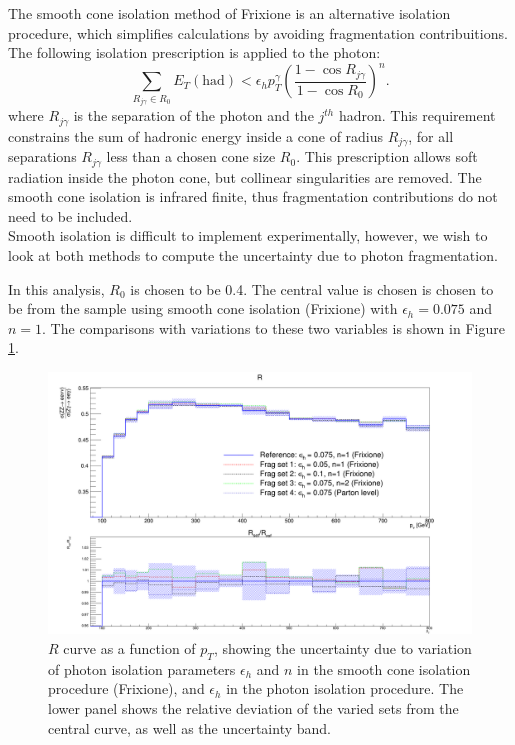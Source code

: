 \documentclass[11pt,a4paper,final]{report}
\begin{document}
The smooth cone isolation method of Frixione \cite{frixione} is an alternative isolation procedure, which simplifies calculations by avoiding fragmentation contribuitions. The following isolation prescription is applied to the photon:
\begin{equation}
	\sum_{R_{j\gamma} \in R_0} E_T(\text{had}) < \epsilon_h p_T^\gamma \left(\frac{1-\cos R_{j\gamma}}{1-\cos R_0}\right)^n.
\end{equation}
\label{eq:frix_isol}
where $R_{j\gamma}$ is the separation of the photon and the $j^{th}$ hadron. This requirement constrains the sum of hadronic energy inside a cone of radius $R_{j\gamma}$, for all separations $R_{j\gamma}$ less than a chosen cone size $R_0$. This prescription allows soft radiation inside the photon cone, but collinear singularities are removed. The smooth cone isolation is infrared finite, thus fragmentation contributions do not need to be included.\\
Smooth isolation is difficult to implement experimentally, however, we wish to look at both methods to compute the uncertainty due to photon fragmentation.

In this analysis, $R_0$ is chosen to be 0.4. The central value is chosen is chosen to be from the sample using smooth cone isolation (Frixione) with $\epsilon_h = 0.075$ and $n=1$. The comparisons with variations to these two variables is shown in Figure \ref{fig:photon_frag}.

\begin{figure}[H]
\centering
	\includegraphics[width=\textwidth]{frag.png}
	\caption{$R$ curve as a function of $p_T$, showing the uncertainty due to variation of photon isolation parameters $\epsilon_h$ and $n$ in the smooth cone isolation procedure (Frixione), and $\epsilon_h$ in the photon isolation procedure. The lower panel shows the relative deviation of the varied sets from the central curve, as well as the uncertainty band.}
	\label{fig:photon_frag}
\end{figure}
\end{document}
